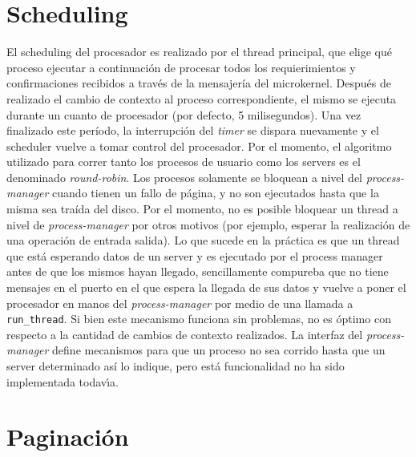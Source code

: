\documentclass[11pt, letterpaper, twoside]{book}
\begin{document}
\section{Scheduling}

El scheduling del procesador es realizado por el thread principal, que elige qu\'e proceso ejecutar a continuaci\'on de procesar todos los requierimientos y confirmaciones recibidos a trav\'es de la mensajer\'ia del microkernel. Despu\'es de realizado el cambio de contexto al proceso correspondiente, el mismo se ejecuta durante un cuanto de procesador (por defecto, 5 milisegundos). Una vez finalizado este per\'iodo, la interrupci\'on del \emph{timer} se dispara nuevamente y el scheduler vuelve a tomar control del procesador. Por el momento, el algoritmo utilizado para correr tanto los procesos de usuario como los servers es el denominado \emph{round-robin}. Los procesos solamente se bloquean a nivel del \emph{process-manager} cuando tienen un fallo de p\'agina, y no son ejecutados hasta que la misma sea tra\'ida del disco. Por el momento, no es posible bloquear un thread a nivel de \emph{process-manager} por otros motivos (por ejemplo, esperar la realizaci\'on de una operaci\'on de entrada salida). Lo que sucede en la pr\'actica es que un thread que est\'a esperando datos de un server y es ejecutado por el process manager antes de que los mismos hayan llegado, sencillamente compureba que no tiene mensajes en el puerto en el que espera la llegada de sus datos y vuelve a poner el procesador en manos del \emph{process-manager} por medio de una llamada a \texttt{run\_thread}. Si bien este mecanismo funciona sin problemas, no es \'optimo con respecto a la cantidad de cambios de contexto realizados. La interfaz del \emph{process-manager} define mecanismos para que un proceso no sea corrido hasta que un server determinado as\'i lo indique, pero est\'a funcionalidad no ha sido implementada todav\'\i{}a.

\section{Paginaci\'on}
\end{document}
